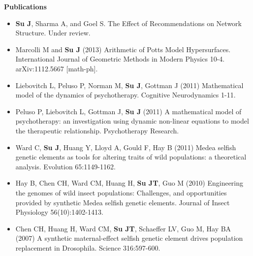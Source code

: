 \documentclass[letterpaper,10pt]{article}
\newcommand{\resheading}[1]{{\large \colorbox{mygrey}{\begin{minipage}{\textwidth}{\textbf{#1 \vphantom{p\^{E}}}}\end{minipage}}}}
\begin{document}
\resheading{Publications}
\begin{itemize}
  \item \textbf{Su J}, Sharma A, and Goel S.  The Effect of Recommendations on Network Structure.  Under review.
	\item Marcolli M and \textbf{Su J} (2013) Arithmetic of Potts Model Hypersurfaces.  International Journal of Geometric Methods in Modern Physics 10-4.  arXiv:1112.5667 [math-ph].
	\item Liebovitch L, Peluso P, Norman M, \textbf{Su J}, Gottman J (2011) Mathematical model of the dynamics of psychotherapy.  Cognitive Neurodynamics 1-11.
	\item Peluso P, Liebovitch L, Gottman J, \textbf{Su J} (2011) A mathematical model of psychotherapy: an investigation using dynamic non-linear equations to model the therapeutic relationship.  Psychotherapy Research.
	\item Ward C, \textbf{Su J}, Huang Y, Lloyd A, Gould F, Hay B (2011) Medea selfish genetic elements as tools for altering traits of wild populations: a theoretical analysis.  Evolution 65:1149-1162.
	\item Hay B, Chen CH, Ward CM, Huang H, \textbf{Su JT}, Guo M (2010) Engineering the genomes of wild insect populations: Challenges, and opportunities provided by synthetic Medea selfish genetic elements.  Journal of Insect Physiology 56(10):1402-1413.
	\item Chen CH, Huang H, Ward CM, \textbf{Su JT}, Schaeffer LV, Guo M, Hay BA (2007) A synthetic maternal-effect selfish genetic element drives population replacement in Drosophila. Science 316:597-600.
\end{itemize}
\end{document}
